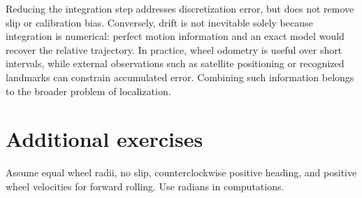 Reducing the integration step addresses discretization error, but does not
remove slip or calibration bias. Conversely, drift is not inevitable solely
because integration is numerical: perfect motion information and an exact
model would recover the relative trajectory. In practice, wheel odometry
is useful over short intervals, while external observations such as satellite
positioning or recognized landmarks can constrain accumulated error.
Combining such information belongs to the broader problem of localization.

\clearpage
\section{Additional exercises}
Assume equal wheel radii, no slip, counterclockwise positive heading, and
positive wheel velocities for forward rolling. Use radians in computations.
